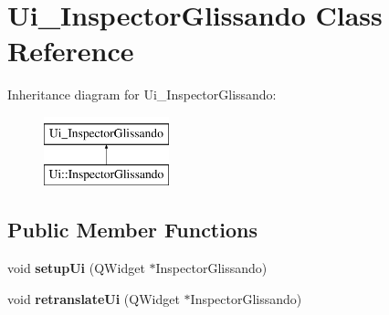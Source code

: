 \hypertarget{class_ui___inspector_glissando}{}\section{Ui\+\_\+\+Inspector\+Glissando Class Reference}
\label{class_ui___inspector_glissando}
Inheritance diagram for Ui\+\_\+\+Inspector\+Glissando\+:\begin{figure}[H]
\begin{center}
\leavevmode
\includegraphics[height=2.000000cm]{class_ui___inspector_glissando}
\end{center}
\end{figure}
\subsection*{Public Member Functions}
\begin{DoxyCompactItemize}
\item 
\mbox{\label{class_ui___inspector_glissando_a7f7a521d4dfe808af5f449350ee82c41}} 
void {\bfseries setup\+Ui} (Q\+Widget $\ast$Inspector\+Glissando)
\item 
\mbox{\label{class_ui___inspector_glissando_a9bd3a1f6322de4583553a76fa397f51f}} 
void {\bfseries retranslate\+Ui} (Q\+Widget $\ast$Inspector\+Glissando)
\end{DoxyCompactItemize}
